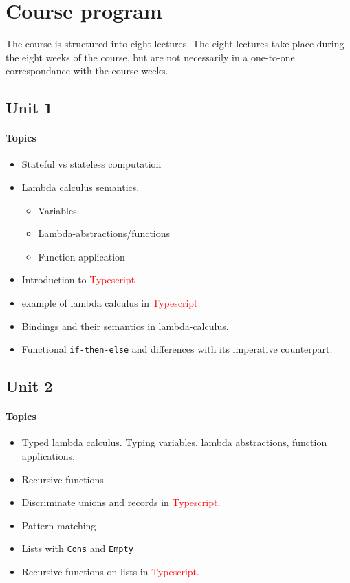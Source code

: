 \section{Course program}
The course is structured into eight lectures.
The eight lectures take place during the eight weeks of the course, but are not necessarily in a one-to-one correspondance with the course weeks.

\subsection*{Unit 1}
\paragraph*{Topics}
\begin{itemize}[noitemsep]
	\item Stateful vs stateless computation
  \item Lambda calculus semantics.
    \begin{itemize}[noitemsep]
      \item Variables
      \item Lambda-abstractions/functions
      \item Function application
    \end{itemize}	
  \item Introduction to \textcolor{red}{Typescript}
  \item example of lambda calculus in \textcolor{red}{Typescript}
  \item Bindings and their semantics in lambda-calculus.
  \item Functional \texttt{if-then-else} and differences with its imperative counterpart.
\end{itemize}

\subsection*{Unit 2}
\paragraph*{Topics}			
\begin{itemize}[noitemsep]
	\item Typed lambda calculus. Typing variables, lambda abstractions, function applications.
  \item Recursive functions.
  \item Discriminate unions and records in \textcolor{red}{Typescript}.
  \item Pattern matching
  \item Lists with \texttt{Cons} and \texttt{Empty}
  \item Recursive functions on lists in \textcolor{red}{Typescript}.
\end{itemize}

